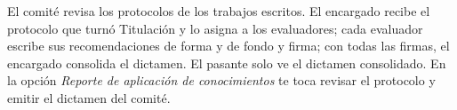 \documentclass[11pt,a4paper]{article}
\begin{document}
{\small\tableofcontents}
\newpage
\begin{quevasahacer}
El comité revisa los protocolos de los trabajos escritos. El encargado recibe el protocolo que turnó Titulación y lo asigna a los evaluadores; cada evaluador escribe sus recomendaciones de forma y de fondo y firma; con todas las firmas, el encargado consolida el dictamen. El pasante solo ve el dictamen consolidado. En la opción \emph{Reporte de aplicación de conocimientos} te toca revisar el protocolo y emitir el dictamen del comité.
\end{quevasahacer}



\end{document}
